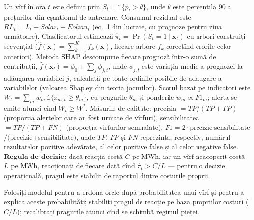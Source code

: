 {Un vîrf în ora $t$ este definit prin $S_t=\mathbb 1\{p_t>\theta\}$, unde $\theta$ este percentila 90 a prețurilor din eșantionul de antrenare. Consumul rezidual este $RL_t=L_t-\mathit{Solar}_t-\mathit{Eolian}_t$ (ec.~1 din lucrare, cu prognoze pentru ziua următoare).
Clasificatorul estimează $\hat\pi_t=\Pr(S_t=1\mid\mathbf x_t)$ cu arbori construiți secvențial ($\hat f(\mathbf x)=\sum_{k=1}^{K}f_k(\mathbf x)$, fiecare arbore $f_k$ corectînd erorile celor anteriori).
Metoda SHAP descompune fiecare prognoză într-o sumă de contribuții, $\hat f(\mathbf x_t)=\phi_0+\sum_j\phi_{j,t}$, unde $\phi_{j,t}$ este variația medie a prognozei la adăugarea variabilei $j$, calculată pe toate ordinile posibile de adăugare a variabilelor (valoarea Shapley din teoria jocurilor).
Scorul bazat pe indicatori este $W_t=\sum_m w_m\,\mathbb 1\{x_{m,t}\ge\theta_m\}$, cu pragurile $\theta_m$ și ponderile $w_m\propto F1_m$; alerta se emite atunci cînd $W_t\ge W^*$.
Măsurile de calitate: precizia $=TP/(TP+FP)$ (proporția alertelor care au fost urmate de vîrfuri), sensibilitatea $=TP/(TP+FN)$ (proporția vîrfurilor semnalate), $F1=2\cdot$precizie$\cdot$sensibilitate$/($precizie$+$sensibilitate$)$, unde $TP$, $FP$ și $FN$ reprezintă, respectiv, numărul rezultatelor pozitive adevărate, al celor pozitive false și al celor negative false.
\textbf{Regula de decizie:} dacă reacția costă $C$ pe MWh, iar un vîrf neacoperit costă $L$ pe MWh, reacționați de fiecare dată cînd $\hat\pi_t>C/L$ --- pentru o decizie operațională, pragul este stabilit de raportul dintre costurile proprii.}
\begin{decision}
%
{Folosiți modelul pentru a ordona orele după probabilitatea unui vîrf și pentru a explica aceste probabilități; stabiliți pragul de reacție pe baza propriilor costuri ($C/L$); recalibrați pragurile atunci cînd se schimbă regimul pieței.}
\end{decision}

